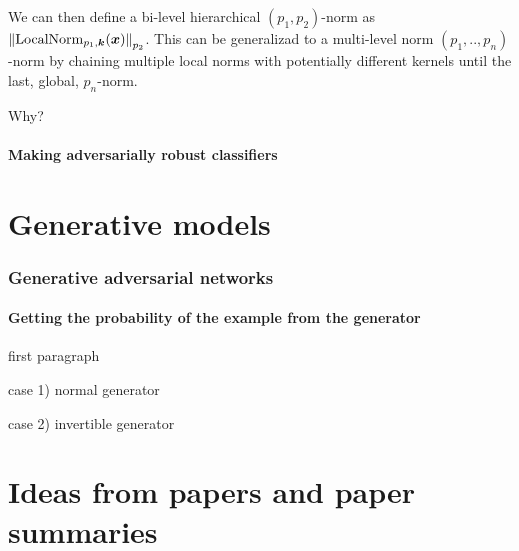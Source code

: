 \documentclass{article}
\begin{document}
We can then define a bi-level hierarchical $(p_1,p_2)$-norm as $\enVert{\mathrm{LocalNorm}_{p_1,\vec k}(\vec x)}_{p_2}$. This can be generalizad to a multi-level norm $(p_1,..,p_n)$-norm by chaining multiple local norms with potentially different kernels until the last, global, $p_n$-norm.

Why?




\subsection{Making adversarially robust classifiers}




\part{Generative models}



\section{Generative adversarial networks}

\subsection{Getting the probability of the example from the generator}

first paragraph

case 1) normal generator

case 2) invertible generator




\part{Ideas from papers and paper summaries}
\end{document}
